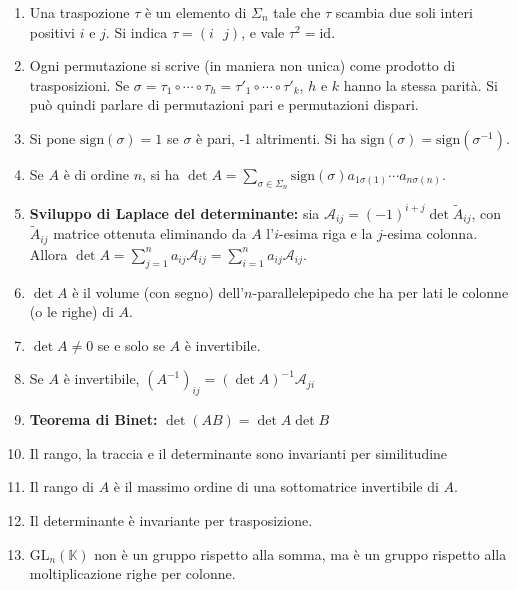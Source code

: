 \documentclass[a4paper,11pt]{article}
\newcommand{\sign}{\mathrm{sign}}					%
\begin{document}
\begin{enumerate}[resume]
	\item Una traspozione $\tau$ è un elemento di $\Sigma_n$ tale che $\tau$ scambia due soli interi positivi $i$ e $j$. Si indica $\tau=\left(i\textrm{  }j\right)$, e vale $\tau^2=\mathrm{id}$.
	\item Ogni permutazione si scrive (in maniera non unica) come prodotto di trasposizioni. Se $\sigma=\tau_1\circ\cdots\circ\tau_h=\tau'_1\circ\cdots\circ\tau'_k$, $h$ e $k$ hanno la stessa parità. Si può quindi parlare di permutazioni pari e permutazioni dispari.
	\item Si pone $\sign(\sigma)=1$ se $\sigma$ è pari, -1 altrimenti. Si ha $\sign(\sigma)=\sign(\sigma^{-1})$.
	\item Se $A$ è di ordine $n$, si ha $\det A=\sum_{\sigma\in\Sigma_n}\sign(\sigma)a_{1\sigma(1)}\cdots a_{n\sigma(n)}$.
	\item \textbf{Sviluppo di Laplace del determinante:} sia $\mathcal{A}_{ij}=(-1)^{i+j}\det\tilde{A}_{ij}$, con $\tilde{A}_{ij}$ matrice ottenuta eliminando da $A$ l'$i$-esima riga e la $j$-esima colonna. Allora $\det A=\sum_{j=1}^{n}a_{ij}\mathcal{A}_{ij}=\sum_{i=1}^{n}a_{ij}\mathcal{A}_{ij}$.
	\item $\det A$ è il volume (con segno) dell'$n$-parallelepipedo che ha per lati le colonne (o le righe) di $A$.
	\item $\det A\neq 0$ se e solo se $A$ è invertibile.
	\item Se $A$ è invertibile, $(A^{-1})_{ij}=(\det A)^{-1}\mathcal{A}_{ji}$
	\item \textbf{Teorema di Binet:} $\det(AB)=\det A\det B$
	\item Il rango, la traccia e il determinante sono invarianti per similitudine
	\item Il rango di $A$ è il massimo ordine di una sottomatrice invertibile di $A$.
	\item Il determinante è invariante per trasposizione.
	\item $\mathrm{GL}_n(\mathbb{K})$ non è un gruppo rispetto alla somma, ma è un gruppo rispetto alla moltiplicazione righe per colonne.
\end{enumerate}
\end{document}
